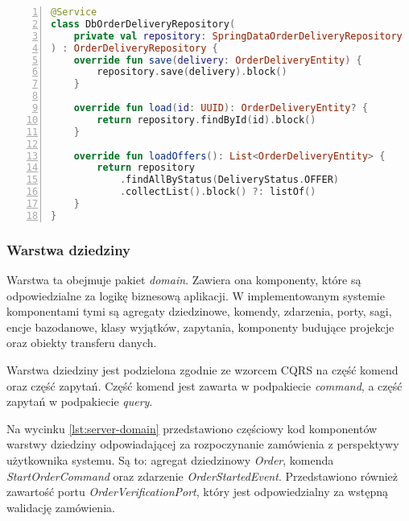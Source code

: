 \begin{lstlisting}[caption={Kod implementacji repozytorium dziedzinowego projekcji Zamówienia},label={lst:server-out-adapter},captionpos=b,language=Kotlin,numbers=left]
@Service
class DbOrderDeliveryRepository(
    private val repository: SpringDataOrderDeliveryRepository
) : OrderDeliveryRepository {
    override fun save(delivery: OrderDeliveryEntity) {
        repository.save(delivery).block()
    }

    override fun load(id: UUID): OrderDeliveryEntity? {
        return repository.findById(id).block()
    }

    override fun loadOffers(): List<OrderDeliveryEntity> {
        return repository
            .findAllByStatus(DeliveryStatus.OFFER)
            .collectList().block() ?: listOf()
    }
}
\end{lstlisting}

\subsubsection{Warstwa dziedziny} 

Warstwa ta obejmuje pakiet \textit{domain}. Zawiera ona komponenty, które są odpowiedzialne za logikę biznesową aplikacji. W implementowanym systemie komponentami tymi są agregaty dziedzinowe, komendy, zdarzenia, porty, sagi, encje bazodanowe, klasy wyjątków, zapytania, komponenty budujące projekcje oraz obiekty transferu danych.

Warstwa dziedziny jest podzielona zgodnie ze wzorcem CQRS na część komend oraz część zapytań. Część komend jest zawarta w podpakiecie \textit{command}, a część zapytań w podpakiecie \textit{query}.

Na wycinku \ref{lst:server-domain} przedstawiono częściowy kod komponentów warstwy dziedziny odpowiadającej za rozpoczynanie zamówienia z perspektywy użytkownika systemu. Są to: agregat dziedzinowy \textit{Order}, komenda \textit{StartOrderCommand} oraz zdarzenie \textit{OrderStartedEvent}. Przedstawiono również zawartość portu \textit{OrderVerificationPort}, który jest odpowiedzialny za wstępną walidację zamówienia.

